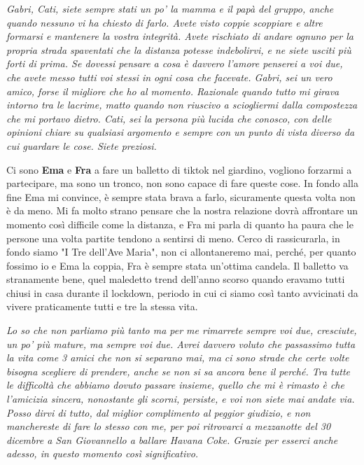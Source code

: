 \textit{Gabri, Cati, siete sempre stati un po' la mamma e il papà del gruppo, anche quando nessuno vi ha chiesto di farlo. Avete visto coppie scoppiare e altre formarsi e mantenere la vostra integrità. Avete rischiato di andare ognuno per la propria strada spaventati che la distanza potesse indebolirvi, e ne siete usciti più forti di prima. Se dovessi pensare a cosa è davvero l'amore penserei a voi due, che avete messo tutti voi stessi in ogni cosa che facevate. Gabri, sei un vero amico, forse il migliore che ho al momento. Razionale quando tutto mi girava intorno tra le lacrime, matto quando non riuscivo a sciogliermi dalla compostezza che mi portavo dietro. Cati, sei la persona più lucida che conosco, con delle opinioni chiare su qualsiasi argomento e sempre con un punto di vista diverso da cui guardare le cose. Siete preziosi.}
\vspace{5mm}

Ci sono \textbf{Ema} e \textbf{Fra} a fare un balletto di tiktok nel giardino, vogliono forzarmi a partecipare, ma sono un tronco, non sono capace di fare queste cose. In fondo alla fine Ema mi convince, è sempre stata brava a farlo, sicuramente questa volta non è da meno. Mi fa molto strano pensare che la nostra relazione dovrà affrontare un momento così difficile come la distanza, e Fra mi parla di quanto ha paura che le persone una volta partite tendono a sentirsi di meno. Cerco di rassicurarla, in fondo siamo "I Tre dell'Ave Maria", non ci allontaneremo mai, perché, per quanto fossimo io e Ema la coppia, Fra è sempre stata un'ottima candela. Il balletto va stranamente bene, quel maledetto trend dell'anno scorso quando eravamo tutti chiusi in casa durante il lockdown, periodo in cui ci siamo così tanto avvicinati da vivere praticamente tutti e tre la stessa vita.
\vspace{5mm}

\textit{Lo so che non parliamo più tanto ma per me rimarrete sempre voi due, cresciute, un po' più mature, ma sempre voi due. Avrei davvero voluto che passassimo tutta la vita come 3 amici che non si separano mai, ma ci sono strade che certe volte bisogna scegliere di prendere, anche se non si sa ancora bene il perché. Tra tutte le difficoltà che abbiamo dovuto passare insieme, quello che mi è rimasto è che l'amicizia sincera, nonostante gli scorni, persiste, e voi non siete mai andate via. Posso dirvi di tutto, dal miglior complimento al peggior giudizio, e non manchereste di fare lo stesso con me, per poi ritrovarci a mezzanotte del 30 dicembre a San Giovannello a ballare Havana Coke. Grazie per esserci anche adesso, in questo momento così significativo.}
\vspace{5mm}

